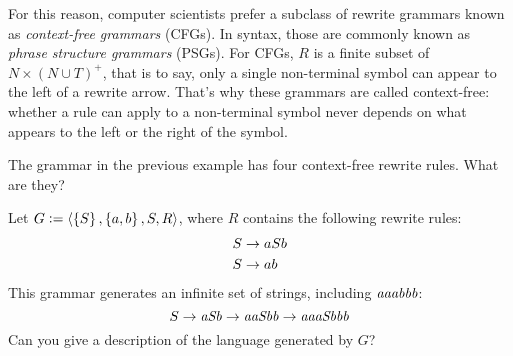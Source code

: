 For this reason, computer scientists prefer a subclass of rewrite grammars known as \emph{context-free grammars} (CFGs).
In syntax, those are commonly known as \emph{phrase structure grammars} (PSGs).
For CFGs, $R$ is a finite subset of $N \times (N \cup T)^+$, that is to say, only a single non-terminal symbol can appear to the left of a rewrite arrow.
That's why these grammars are called context-free: whether a rule can apply to a non-terminal symbol never depends on what appears to the left or the right of the symbol.
%
\begin{exercise}
    The grammar in the previous example has four context-free rewrite rules.
    What are they?
\end{exercise}
%
\begin{examplebox}
    Let $G \mathrel{\mathop:}= \left \langle 
            \left \{ S \right \},
            \left \{ a,b \right \},
            S,
            R \right \rangle $,
    where $R$ contains the following rewrite rules:
    \begin{align*}
        S &\rightarrow aSb\\
        S &\rightarrow ab
    \end{align*}
    This grammar generates an infinite set of strings, including $\mathit{aaabbb}$:
    \[
        S
        \rightarrow \mathit{aSb}
        \rightarrow \mathit{aaSbb}
        \rightarrow \mathit{aaaSbbb}
    \]
    Can you give a description of the language generated by $G$?
\end{examplebox}

